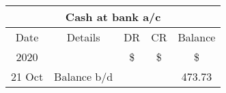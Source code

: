 \documentclass{book}
\begin{document}
\begin{center}
\begin{tabular}{ccccc}
	\multicolumn{5}{c}{Cash at bank a/c}\\
	\hline
	Date&Details&DR&CR&Balance\\
	2020&&\$&\$&\$\\
	21 Oct&Balance b/d&&&473.73\\
\end{tabular}
\end{center}
\end{document}

